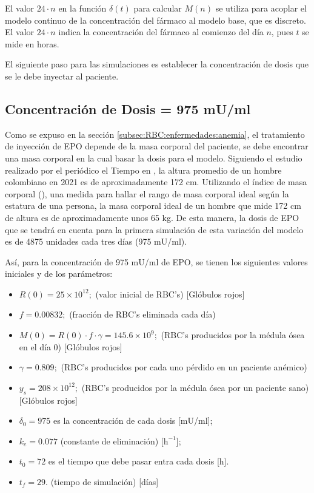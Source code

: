 El valor $24\cdot n$ en la función $\delta(t)$ para calcular $M(n)$ se utiliza para acoplar el modelo continuo de la concentración del fármaco al modelo base, que es discreto. El valor $24 \cdot n$ indica la concentración del fármaco al comienzo del día $n$, pues $t$ se mide en horas.


El siguiente paso para las simulaciones es establecer la concentración de dosis que se le debe inyectar al paciente.

\subsection{Concentración de Dosis  = 975 mU/ml} \label{subsec:variaciones:anemia:mal}

Como se expuso en la sección \ref{subsec:RBC:enfermedades:anemia}, el tratamiento de inyección de EPO depende de la masa corporal del paciente, se debe encontrar una masa corporal en la cual basar la dosis para el modelo. Siguiendo el estudio realizado por el periódico el Tiempo en \cite{elTiempo}, la altura promedio de un hombre colombiano en 2021 es de aproximadamente 172 cm. Utilizando el índice de masa corporal (\cite{IMC}), una medida para hallar el rango de masa corporal ideal según la estatura de una persona, la masa corporal ideal de un hombre que mide 172 cm de altura es de aproximadamente unos 65 kg. De esta manera, la dosis de EPO que se tendrá en cuenta para la primera simulación de esta variación del modelo es de 4875 unidades cada tres días (975 mU/ml).

Así, para la concentración de 975 mU/ml de EPO, se tienen los siguientes valores iniciales y de los parámetros:

\begin{itemize}
    \item $R(0) = 25\times 10^{12};$ (valor inicial de RBC's) [Glóbulos rojos]
    \item $f=0.00832;$ (fracción de RBC's eliminada cada día)
    \item $M(0) = R(0)\cdot f \cdot \gamma = 145.6\times 10^{9};$ (RBC's producidos por la médula ósea en el día 0) [Glóbulos rojos]
    \item $\gamma = 0.809;$ (RBC's producidos por cada uno pérdido en un paciente anémico) 
    \item $y_s = 208\times 10^{12};$ (RBC's producidos por la médula ósea por un paciente sano) [Glóbulos rojos]
    \item $\delta_0=975$ es la concentración de cada dosis [mU/ml];
    \item $k_e=0.077$ (constante de eliminación) [$\textrm{h}^{-1}$];
    \item $t_0=72$ es el tiempo que debe pasar entra cada dosis [h].
    \item $t_f = 29$. (tiempo de simulación) [días]
\end{itemize}


